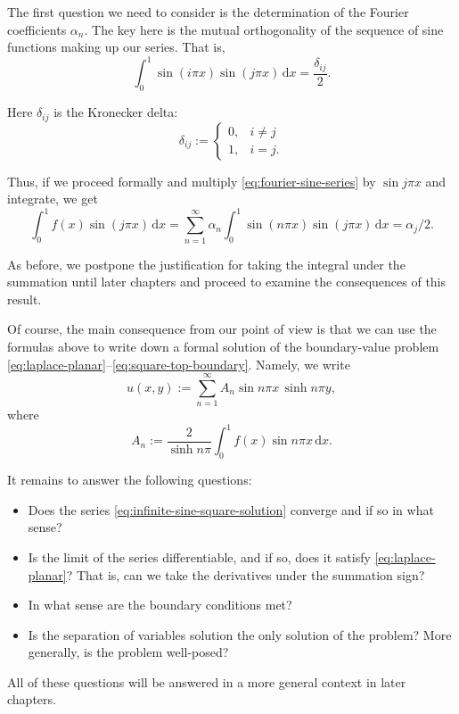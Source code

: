 The first question we need to consider is the determination of the Fourier coefficients $\alpha_n$. The key here is the mutual orthogonality of the sequence of sine functions making up our series. That is,
\begin{equation}\label{eq:sine-orthogonality}
\int_0^1\sin(i\pi x)\sin(j\pi x)\,\mathrm{d}x=\dfrac{\delta_{ij}}{2}.
\end{equation}


Here $\delta_{ij}$ is the Kronecker delta:
\begin{equation}\label{eq:kronecker-delta}
\delta_{ij}:=\begin{cases}0,&i\ne j\\1,&i=j.\end{cases}
\end{equation}


Thus, if we proceed formally and multiply \eqref{eq:fourier-sine-series} by $\sin j\pi x$ and integrate, we get
\begin{equation}\label{eq:sine-coefficient-integral}
\int_0^1f(x)\sin(j\pi x)\,\mathrm{d}x=\sum_{n=1}^{\infty}\alpha_n\int_0^1\sin(n\pi x)\sin(j\pi x)\,\mathrm{d}x=\alpha_j/2.
\end{equation}


As before, we postpone the justification for taking the integral under the summation until later chapters and proceed to examine the consequences of this result.

Of course, the main consequence from our point of view is that we can use the formulas above to write down a formal solution of the boundary-value problem \eqref{eq:laplace-planar}--\eqref{eq:square-top-boundary}. Namely, we write
\begin{equation}\label{eq:infinite-sine-square-solution}
u(x,y):=\sum_{n=1}^{\infty}A_n\sin n\pi x\,\sinh n\pi y,
\end{equation}
where
\begin{equation}\label{eq:infinite-sine-solution-coefficients}
A_n:=\dfrac{2}{\sinh n\pi}\int_0^1f(x)\sin n\pi x\,\mathrm{d}x.
\end{equation}


It remains to answer the following questions:
\begin{itemize}
\item Does the series \eqref{eq:infinite-sine-square-solution} converge and if so in what sense?
\item Is the limit of the series differentiable, and if so, does it satisfy \eqref{eq:laplace-planar}? That is, can we take the derivatives under the summation sign?
\item In what sense are the boundary conditions met?
\item Is the separation of variables solution the only solution of the problem? More generally, is the problem well-posed?
\end{itemize}
All of these questions will be answered in a more general context in later chapters.

